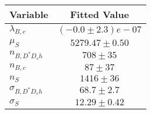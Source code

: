 \begin{tabular}[t]{lc}
\hline
Variable &Fitted Value\\
\hline\hline
$\lambda_{B,c}$&$(-0.0\pm2.3)e-07$\\
\hline
$\mu_S$&$5279.47\pm0.50$\\
\hline
$n_{B, D^* D_s h}$&$708\pm35$\\
\hline
$n_{B,c}$&$87\pm37$\\
\hline
$n_S$&$1416\pm36$\\
\hline
$\sigma_{B, D^* D_s h}$&$68.7\pm2.7$\\
\hline
$\sigma_S$&$12.29\pm0.42$\\
\hline
\end{tabular}